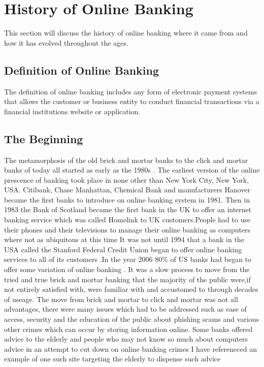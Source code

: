 \section{History of Online Banking}
This section will discuss the history of online banking where it came from and how
it has evolved throughout the ages.
\subsection{Definition of Online Banking}
The definition of online banking includes any form of electronic payment systems
that allows the customer or business entity to conduct financial transactions
via a financial institutions website or application.
\subsection{The Beginning}
The metamorphosis of the old brick and mortar banks to the click and mortar banks of
today all started as early as the 1980s \cite{HistoryBanking}. The earliest version
of the online prescence of banking took place in none other than New York City, New York,
USA.  Citibank, Chase Manhattan, Chemical Bank and manufacturers Hanover became the
first banks to introduce on online banking system in 1981.\cite{HistoryBanking}
Then in 1983 the Bank of Scotland became the first bank in the UK to offer an
internet banking service which was called Homelink to UK customers.People had to
use their phones and their televisions to manage their online banking as computers
where not as ubiquitous at this time \cite{HistoryBanking} It was not until 1994
that a bank in the USA called the Stanford Federal Credit Union began to offer online
banking services to all of its customers \cite{HistoryBanking}.In the year 2006 80\% of US banks had began to offer
some variation of online banking \cite{HistoryBanking}.
It was a slow process to move from the tried and true brick and mortar banking that the majority of the public
were,if not entirely satisfied with, were familiar with and accustomed to through decades of
useage. The move from brick and mortar to click and mortar was not all advantages, there were many issues
which had to be addressed such as ease of access, security and the education of the public about phishing scams
and various other crimes which can occur by storing information online.  Some banks offered advice to the elderly
and people who may not know so much about computers advice in an attempt to cut down on online banking crimes I have refereneced an example of one such site targeting the elderly to dispense such advice \cite{BOIElderly}

